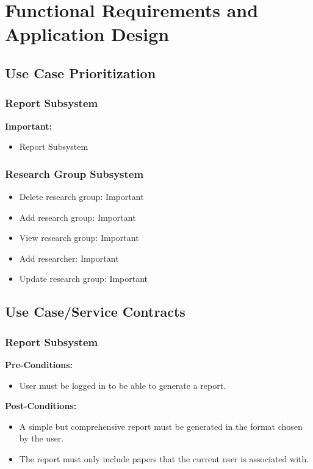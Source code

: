 \documentclass{article}
\begin{document}
	\section{Functional Requirements and Application Design}
	\subsection{Use Case Prioritization}
	\subsubsection{Report Subsystem}
	\textbf{Important:}
	\begin{itemize}
		\item Report Subsystem
	\end{itemize}

	\subsubsection{Research Group Subsystem}
	
	  \begin{itemize}
	  \item Delete research group: Important 
	  \item Add research group: Important
	  \item View research group: Important
	  \item Add researcher: Important
	  \item Update research group: Important
	\end{itemize}
	
		

	\subsection{Use Case/Service Contracts}
	\subsubsection{Report Subsystem}
	\textbf{Pre-Conditions:}
	\begin{itemize}
		\item User must be logged in to be able to generate a report.
	\end{itemize}
	\textbf{Post-Conditions:}
	\begin{itemize}
		\item A simple but comprehensive report must be generated in the format chosen by the user.
		\item The report must only include papers that the current user is associated with.
	\end{itemize}
	
\end{document}
